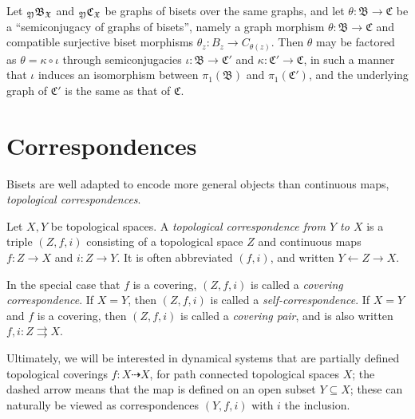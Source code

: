 \documentclass{amsart}
\begin{document}
\begin{lem}
  Let ${}_{\mathfrak Y}\mathfrak B_{\mathfrak X}$ and ${}_{\mathfrak Y}\mathfrak
  C_{\mathfrak X}$ be graphs of bisets over the same graphs, and let
  $\theta\colon\mathfrak B\to\mathfrak C$ be a ``semiconjugacy of graphs of
  bisets'', namely a graph morphism $\theta\colon\mathfrak B\to\mathfrak C$
  and compatible surjective biset morphisms $\theta_z\colon B_z\to
  C_{\theta(z)}$. Then $\theta$ may be factored as
  $\theta=\kappa\circ\iota$ through semiconjugacies $\iota\colon\mathfrak
  B\to\mathfrak C'$ and $\kappa\colon\mathfrak C'\to\mathfrak C$, in such a
  manner that $\iota$ induces an isomorphism between $\pi_1(\mathfrak
  B)$ and $\pi_1(\mathfrak C')$, and the underlying graph of
  $\mathfrak C'$ is the same as that of $\mathfrak C$.
\end{lem}

\section{Correspondences}\label{ss:corr}
Bisets are well adapted to encode more general objects than continuous
maps, \emph{topological correspondences}.
\begin{defn}[Correspondences]
  Let $X,Y$ be topological spaces. A \emph{topological correspondence from
    $Y$ to $X$} is a triple $(Z,f,i)$ consisting of a topological space $Z$
  and continuous maps $f\colon Z\to X$ and $i\colon Z\to Y$. It is often
  abbreviated $(f,i)$, and written $Y\leftarrow Z\to X$.

  In the special case that $f$ is a covering, $(Z,f,i)$ is called a
  \emph{covering correspondence}.  If $X=Y$, then $(Z,f,i)$ is called
  a \emph{self-correspondence}. If $X=Y$ and $f$ is a covering, then
  $(Z,f,i)$ is called a \emph{covering pair}, and is also written
  $f,i\colon Z\rightrightarrows X$.
\end{defn}

Ultimately, we will be interested in dynamical systems that are
partially defined topological coverings $f\colon X\dashrightarrow X$, for
path connected topological spaces $X$; the dashed arrow means that the
map is defined on an open subset $Y\subseteq X$; these can naturally
be viewed as correspondences $(Y,f,i)$ with $i$ the inclusion.
\end{document}
